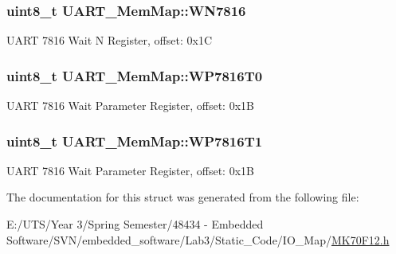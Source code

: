 \subsubsection[{W\+N7816}]{\setlength{\rightskip}{0pt plus 5cm}uint8\+\_\+t U\+A\+R\+T\+\_\+\+Mem\+Map\+::\+W\+N7816}\label{struct_u_a_r_t___mem_map_aed09f864d4f1afe57f146ff72949c3d2}
U\+A\+R\+T 7816 Wait N Register, offset\+: 0x1\+C \hypertarget{struct_u_a_r_t___mem_map_a4555ab88b0e4f56c44b30d549b5b0666}{}
\subsubsection[{W\+P7816\+T0}]{\setlength{\rightskip}{0pt plus 5cm}uint8\+\_\+t U\+A\+R\+T\+\_\+\+Mem\+Map\+::\+W\+P7816\+T0}\label{struct_u_a_r_t___mem_map_a4555ab88b0e4f56c44b30d549b5b0666}
U\+A\+R\+T 7816 Wait Parameter Register, offset\+: 0x1\+B \hypertarget{struct_u_a_r_t___mem_map_a7d456ca4a3be9b4c083253fe2d30d404}{}
\subsubsection[{W\+P7816\+T1}]{\setlength{\rightskip}{0pt plus 5cm}uint8\+\_\+t U\+A\+R\+T\+\_\+\+Mem\+Map\+::\+W\+P7816\+T1}\label{struct_u_a_r_t___mem_map_a7d456ca4a3be9b4c083253fe2d30d404}
U\+A\+R\+T 7816 Wait Parameter Register, offset\+: 0x1\+B 

The documentation for this struct was generated from the following file\+:\begin{DoxyCompactItemize}
\item 
E\+:/\+U\+T\+S/\+Year 3/\+Spring Semester/48434 -\/ Embedded Software/\+S\+V\+N/embedded\+\_\+software/\+Lab3/\+Static\+\_\+\+Code/\+I\+O\+\_\+\+Map/\hyperlink{_m_k70_f12_8h}{M\+K70\+F12.\+h}\end{DoxyCompactItemize}
